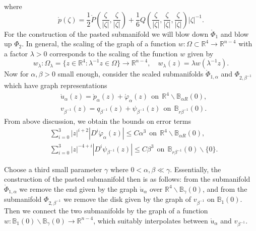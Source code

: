 \documentclass[11pt,letterpaper]{amsart}
\newcommand{\bB}{\mathbb{B}}
\newcommand{\bR}{\mathbb{R}}
\theoremstyle{definition}
\theoremstyle{remark}
\numberwithin{equation}{section}
\begin{document}
where
\begin{equation}\label{expression-of-traceless-p}
    \mathring{p}(\zeta)=\frac{1}{2}\mathring{P}\left(\frac{\zeta}{|\zeta|},\frac{\zeta}{|\zeta|} \right)+\frac{1}{6}Q\left(\frac{\zeta}{|\zeta|},\frac{\zeta}{|\zeta|},\frac{\zeta}{|\zeta|} \right)|\zeta|^{-1}.
\end{equation}
 For the construction of the pasted submanifold we will blow down $\mathring{\Phi}_1$ and blow up $\Phi_2$. In general, the scaling of the graph of a function $w:\Omega\subset \bR^4 \to \bR^{n-4}$ with a factor $\lambda>0$ corresponds to the scaling of the function $w$ given by
\begin{equation*}
    w_{\lambda}: \Omega_{\lambda}=\{z\in\bR^4: \lambda^{-1}z\in \Omega\}\to \bR^{n-4}, \quad w_{\lambda}(z)=\lambda w(\lambda^{-1} z).
\end{equation*}
Now for $\alpha, \beta>0$ small enough, consider the scaled submanifolds $ \mathring{\Phi}_{1,\alpha}$ and $\Phi_{2,\beta^{-1}}$ which have graph representations
\begin{equation}
    \begin{split}
        &\mathring{u}_{\alpha}(z)=\mathring{p}_{\alpha}(z)+\mathring{\varphi}_{\alpha}(z) ~~\mbox{on}~~ \bR^4\backslash \mathbb{B}_{\alpha R}(0),\\
        & v_{\beta^{-1}}(z)=q_{\beta^{-1}}(z)+\psi_{\beta^{-1}}(z) ~~\mbox{on}~~ \mathbb{B}_{r\beta^{-1}}(0).
    \end{split}
\end{equation}
From above discussion, we obtain the bounds on error terms
\begin{equation}\label{rescale-decay}
\begin{split}
    &\sum_{i=0}^{3} |z|^{i+2}|D^{i}\mathring{\varphi}_{\alpha}(z)|\leq C\alpha^3  ~~\mbox{on}~~ \bR^4\backslash \bB_{\alpha R}(0),\\
    &\sum_{i=0}^{3} |z|^{-4+i}|D^{i}\psi_{\beta^{-1}}(z)|\leq C\beta^3  ~~\mbox{on}~~ \bB_{r\beta^{-1}}(0)\backslash \{0\}.
    \end{split}
\end{equation}

Choose a third small parameter $\gamma$ where $0<\alpha, \beta \ll \gamma$. Essentially, the construction of the pasted submanifold then is as follows: from the submanifold $ \mathring{\Phi}_{1,\alpha}$ we remove the end given by the graph $\mathring{u}_{\alpha}$ over $\bR^4\backslash \bB_{\gamma}(0)$, and from the submanifold $\Phi_{2,\beta^{-1}}$ we remove the disk given by the graph of $v_{\beta^{-1}}$ on $\bB_1(0)$. Then we connect the two submanifolds by the graph of a function $w: \bB_1(0)\backslash \bB_{\gamma}(0)\to \bR^{n-4}$, which suitably interpolates between $\mathring{u}_{\alpha}$ and $v_{\beta^{-1}}$.
\end{document}

